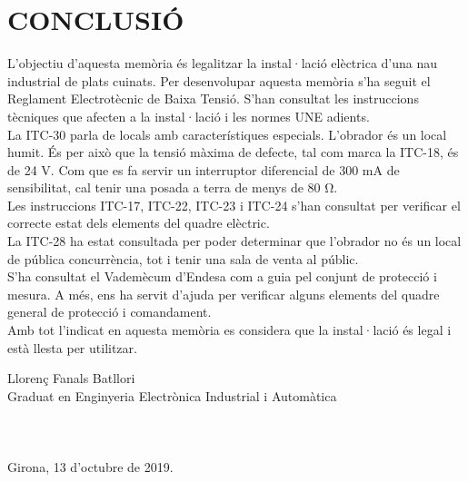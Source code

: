 \chapter{\uppercase{Conclusió}}
L'objectiu d'aquesta memòria és legalitzar la instal·lació elèctrica d'una nau industrial de plats cuinats.
Per desenvolupar aquesta memòria s'ha seguit el Reglament Electrotècnic de Baixa Tensió. S'han consultat les instruccions tècniques que afecten a la instal·lació i les normes UNE adients.\\
\newline La ITC-30 parla de locals amb característiques especials. L'obrador és un local humit. És per això que la tensió màxima de defecte, tal com marca la ITC-18, és de 24 V. Com que es fa servir un interruptor diferencial de 300 mA de sensibilitat, cal tenir una posada a terra de menys de 80 $\si\ohm$.\\
\newline Les instruccions ITC-17, ITC-22, ITC-23 i ITC-24 s'han consultat per verificar el correcte estat dels elements del quadre elèctric.\\
\newline La ITC-28 ha estat consultada per poder determinar que l'obrador no és un local de pública concurrència, tot i tenir una sala de venta al públic.\\
\newline S'ha consultat el Vademècum d'Endesa com a guia pel conjunt de protecció i mesura. A més, ens ha servit d'ajuda per verificar alguns elements del quadre general de protecció i comandament.\\
\newline Amb tot l'indicat en aquesta memòria es considera que la instal·lació és legal i està llesta per utilitzar.

\vspace*{\fill}
\noindent Llorenç Fanals Batllori\\
Graduat en Enginyeria Electrònica Industrial i Automàtica\\
\\
\\
\\
Girona, 13 d'octubre de 2019.

\clearpage